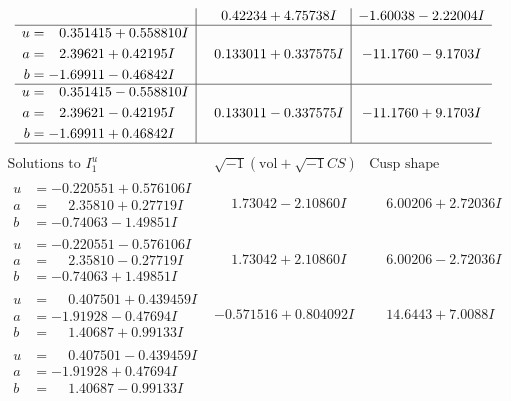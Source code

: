 \documentclass[1p]{elsarticle_modified}
\theoremstyle{definition}
\newcommand{\I}{\sqrt{-1}}
\begin{document}
$$\begin{array}{c|c|c}
 & \phantom{-}0.42234 + 4.75738 I & -1.60038 - 2.22004 I \\ \hline\begin{aligned}
u &= \phantom{-}0.351415 + 0.558810 I \\
a &= \phantom{-}2.39621 + 0.42195 I \\
b &= -1.69911 - 0.46842 I\end{aligned}
 & \phantom{-}0.133011 + 0.337575 I & -11.1760 - 9.1703 I \\ \hline\begin{aligned}
u &= \phantom{-}0.351415 - 0.558810 I \\
a &= \phantom{-}2.39621 - 0.42195 I \\
b &= -1.69911 + 0.46842 I\end{aligned}
 & \phantom{-}0.133011 - 0.337575 I & -11.1760 + 9.1703 I\\
 \hline 
 \end{array}$$\newpage$$\begin{array}{c|c|c}  
\text{Solutions to }I^u_{1}& \I (\text{vol} + \sqrt{-1}CS) & \text{Cusp shape}\\
 \hline 
\begin{aligned}
u &= -0.220551 + 0.576106 I \\
a &= \phantom{-}2.35810 + 0.27719 I \\
b &= -0.74063 - 1.49851 I\end{aligned}
 & \phantom{-}1.73042 - 2.10860 I & \phantom{-}6.00206 + 2.72036 I \\ \hline\begin{aligned}
u &= -0.220551 - 0.576106 I \\
a &= \phantom{-}2.35810 - 0.27719 I \\
b &= -0.74063 + 1.49851 I\end{aligned}
 & \phantom{-}1.73042 + 2.10860 I & \phantom{-}6.00206 - 2.72036 I \\ \hline\begin{aligned}
u &= \phantom{-}0.407501 + 0.439459 I \\
a &= -1.91928 - 0.47694 I \\
b &= \phantom{-}1.40687 + 0.99133 I\end{aligned}
 & -0.571516 + 0.804092 I & \phantom{-}14.6443 + 7.0088 I \\ \hline\begin{aligned}
u &= \phantom{-}0.407501 - 0.439459 I \\
a &= -1.91928 + 0.47694 I \\
b &= \phantom{-}1.40687 - 0.99133 I\end{aligned}

\end{array}$$
\end{document}
